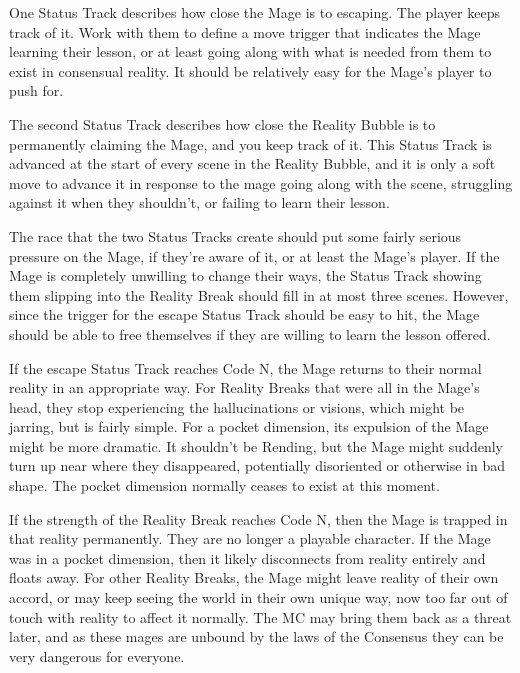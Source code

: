 \documentclass[
  oneside,
  statementpaper,
  9pt]{memoir}
\begin{document}
\begin{MC}

One Status Track describes how close the Mage is to escaping. The player keeps track of it. Work with them to define a move trigger that indicates the Mage learning their lesson, or at least going along with what is needed from them to exist in consensual reality. It should be relatively easy for the Mage's player to push for.

The second Status Track describes how close the Reality Bubble is to permanently claiming the Mage, and you keep track of it. This Status Track is advanced at the start of every scene in the Reality Bubble, and it is only a soft move to advance it in response to the mage going along with the scene, struggling against it when they shouldn’t, or failing to learn their lesson.

The race that the two Status Tracks create should put some fairly serious pressure on the Mage, if they’re aware of it, or at least the Mage’s player. If the Mage is completely unwilling to change their ways, the Status Track showing them slipping into the Reality Break should fill in at most three scenes. However, since the trigger for the escape Status Track should be easy to hit, the Mage should be able to free themselves if they are willing to learn the lesson offered.

If the escape Status Track reaches Code N, the Mage returns to their normal reality in an appropriate way. For Reality Breaks that were all in the Mage’s head, they stop experiencing the hallucinations or visions, which might be jarring, but is fairly simple. For a pocket dimension, its expulsion of the Mage might be more dramatic. It shouldn’t be Rending, but the Mage might suddenly turn up near where they disappeared, potentially disoriented or otherwise in bad shape. The pocket dimension normally ceases to exist at this moment.

If the strength of the Reality Break reaches Code N, then the Mage is trapped in that reality permanently. They are no longer a playable character. If the Mage was in a pocket dimension, then it likely disconnects from reality entirely and floats away. For other Reality Breaks, the Mage might leave reality of their own accord, or may keep seeing the world in their own unique way, now too far out of touch with reality to affect it normally. The MC may bring them back as a threat later, and as these mages are unbound by the laws of the Consensus they can be very dangerous for everyone.


\end{MC}
\end{document}
